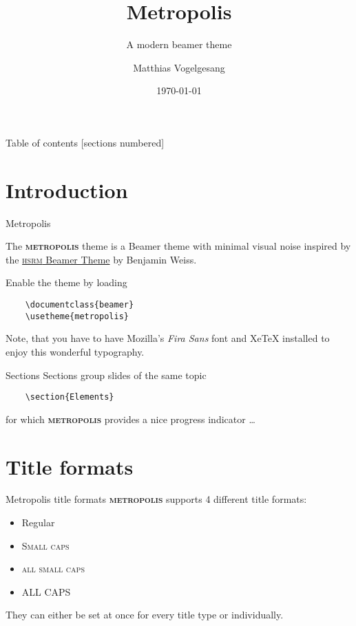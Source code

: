 \documentclass[10pt]{beamer}
\title{Metropolis}
\subtitle{A modern beamer theme}
\date{\today}
\author{Matthias Vogelgesang}
\institute{Center for modern beamer themes}
\newcommand{\themename}{\textbf{\textsc{metropolis}}\xspace}
\begin{document}
\maketitle

\begin{frame}{Table of contents}
  [sections numbered]
  \tableofcontents[hideallsubsections]
\end{frame}

\section{Introduction}

\begin{frame}[fragile]{Metropolis}

  The \themename theme is a Beamer theme with minimal visual noise
  inspired by the \href{https://github.com/hsrmbeamertheme/hsrmbeamertheme}{\textsc{hsrm} Beamer
    Theme} by Benjamin Weiss.

  Enable the theme by loading

  \begin{verbatim}    \documentclass{beamer}
    \usetheme{metropolis}\end{verbatim}

  Note, that you have to have Mozilla's \emph{Fira Sans} font and XeTeX
  installed to enjoy this wonderful typography.
\end{frame}
\begin{frame}[fragile]{Sections}
  Sections group slides of the same topic

  \begin{verbatim}    \section{Elements}\end{verbatim}

  for which \themename provides a nice progress indicator \ldots
\end{frame}

\section{Title formats}

\begin{frame}{Metropolis title formats}
  \themename supports 4 different title formats:
  \begin{itemize}
    \item Regular
    \item \textsc{Small caps}
    \item \textsc{all small caps}
    \item ALL CAPS
  \end{itemize}
  They can either be set at once for every title type or individually.
\end{frame}
\end{document}
